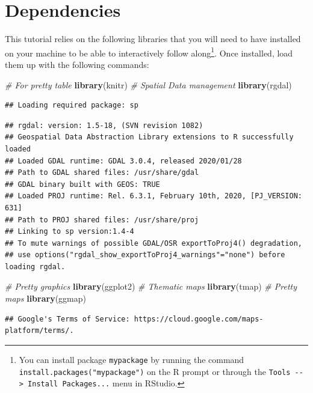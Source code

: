 \documentclass[
]{book}
\newenvironment{Shaded}{\begin{snugshade}}{\end{snugshade}}
\newcommand{\CommentTok}[1]{\textcolor[rgb]{0.56,0.35,0.01}{\textit{#1}}}
\newcommand{\KeywordTok}[1]{\textcolor[rgb]{0.13,0.29,0.53}{\textbf{#1}}}
\newcommand{\NormalTok}[1]{#1}
\begin{document}
\hypertarget{dependencies-1}{%
\section{Dependencies}\label{dependencies-1}}

This tutorial relies on the following libraries that you will need to have installed on your machine to be able to interactively follow along\footnote{You can install package \texttt{mypackage} by running the command \texttt{install.packages("mypackage")} on the R prompt or through the \texttt{Tools\ -\/-\textgreater{}\ Install\ Packages...} menu in RStudio.}. Once installed, load them up with the following commands:

\begin{Shaded}
\begin{Highlighting}[]
\CommentTok{# For pretty table}
\KeywordTok{library}\NormalTok{(knitr)}
\CommentTok{# Spatial Data management}
\KeywordTok{library}\NormalTok{(rgdal)}
\end{Highlighting}
\end{Shaded}

\begin{verbatim}
## Loading required package: sp
\end{verbatim}

\begin{verbatim}
## rgdal: version: 1.5-18, (SVN revision 1082)
## Geospatial Data Abstraction Library extensions to R successfully loaded
## Loaded GDAL runtime: GDAL 3.0.4, released 2020/01/28
## Path to GDAL shared files: /usr/share/gdal
## GDAL binary built with GEOS: TRUE 
## Loaded PROJ runtime: Rel. 6.3.1, February 10th, 2020, [PJ_VERSION: 631]
## Path to PROJ shared files: /usr/share/proj
## Linking to sp version:1.4-4
## To mute warnings of possible GDAL/OSR exportToProj4() degradation,
## use options("rgdal_show_exportToProj4_warnings"="none") before loading rgdal.
\end{verbatim}

\begin{Shaded}
\begin{Highlighting}[]
\CommentTok{# Pretty graphics}
\KeywordTok{library}\NormalTok{(ggplot2)}
\CommentTok{# Thematic maps}
\KeywordTok{library}\NormalTok{(tmap)}
\CommentTok{# Pretty maps}
\KeywordTok{library}\NormalTok{(ggmap)}
\end{Highlighting}
\end{Shaded}

\begin{verbatim}
## Google's Terms of Service: https://cloud.google.com/maps-platform/terms/.
\end{verbatim}
\end{document}
